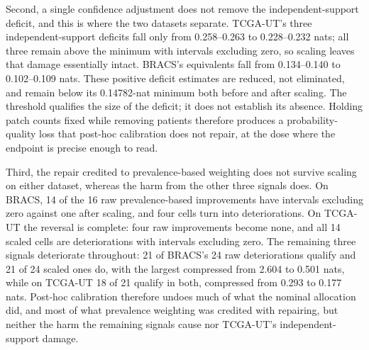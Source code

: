 Second, a single confidence adjustment does not remove the independent-support deficit, and this is where the two datasets separate. TCGA-UT's three independent-support deficits fall only from \num{0.258}--\num{0.263} to \num{0.228}--\num{0.232} nats; all three remain above the minimum with intervals excluding zero, so scaling leaves that damage essentially intact. BRACS's equivalents fall from \num{0.134}--\num{0.140} to \num{0.102}--\num{0.109} nats. These positive deficit estimates are reduced, not eliminated, and remain below its \num{0.14782}-nat minimum both before and after scaling. The threshold qualifies the size of the deficit; it does not establish its absence. Holding patch counts fixed while removing patients therefore produces a probability-quality loss that post-hoc calibration does not repair, at the dose where the endpoint is precise enough to read.

Third, the repair credited to prevalence-based weighting does not survive scaling on either dataset, whereas the harm from the other three signals does. On BRACS, \num{14} of the \num{16} raw prevalence-based improvements have intervals excluding zero against one after scaling, and four cells turn into deteriorations. On TCGA-UT the reversal is complete: four raw improvements become none, and all \num{14} scaled cells are deteriorations with intervals excluding zero. The remaining three signals deteriorate throughout: \num{21} of BRACS's \num{24} raw deteriorations qualify and \num{21} of \num{24} scaled ones do, with the largest compressed from \num{2.604} to \num{0.501} nats, while on TCGA-UT \num{18} of \num{21} qualify in both, compressed from \num{0.293} to \num{0.177} nats. Post-hoc calibration therefore undoes much of what the nominal allocation did, and most of what prevalence weighting was credited with repairing, but neither the harm the remaining signals cause nor TCGA-UT's independent-support damage.

